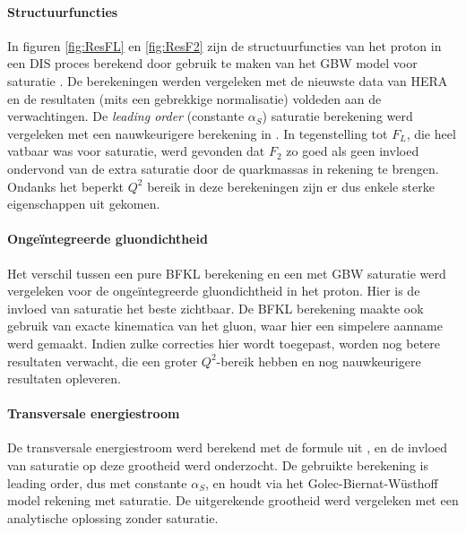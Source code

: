 \documentclass[a4paper,11pt]{article}
\numberwithin{equation}{section} %
\begin{document}
      \paragraph{Structuurfuncties}
In figuren \ref{fig:ResFL} en \ref{fig:ResF2} zijn de structuurfuncties van het proton in een DIS proces berekend door gebruik te maken van het GBW model voor saturatie \cite{GB} \cite{GBW}.
De berekeningen werden vergeleken met de nieuwste data van HERA \cite{H1} \cite{ZEUS} en de resultaten (mits een gebrekkige normalisatie) voldeden aan de verwachtingen.
De \textit{leading order} (constante $\alpha_S$) saturatie berekening werd vergeleken met een nauwkeurigere berekening in \cite{Stasto}.
In tegenstelling tot $F_L$, die heel vatbaar was voor saturatie, werd gevonden dat $F_2$ zo goed als geen invloed ondervond van de extra saturatie door de quarkmassas in rekening te brengen.
Ondanks het beperkt $Q^2$ bereik in deze berekeningen zijn er dus enkele sterke eigenschappen uit gekomen.

      \paragraph{Ongeïntegreerde gluondichtheid}
Het verschil tussen een pure BFKL berekening en een met GBW saturatie werd vergeleken voor de ongeïntegreerde gluondichtheid in het proton.
Hier is de invloed van saturatie het beste zichtbaar.
De BFKL berekening maakte ook gebruik van exacte kinematica van het gluon, waar hier een simpelere aanname werd gemaakt.
Indien zulke correcties hier wordt toegepast, worden nog betere resultaten verwacht, die een groter $Q^2$-bereik hebben en nog nauwkeurigere resultaten opleveren.

      \paragraph{Transversale energiestroom}
De transversale energiestroom werd berekend met de formule uit \cite{ET}, en de invloed van saturatie op deze grootheid werd onderzocht.
De gebruikte berekening is leading order, dus met constante $\alpha_S$, en houdt via het Golec-Biernat-Wüsthoff model rekening met saturatie.
De uitgerekende grootheid werd vergeleken met een analytische oplossing zonder saturatie.
\end{document}
